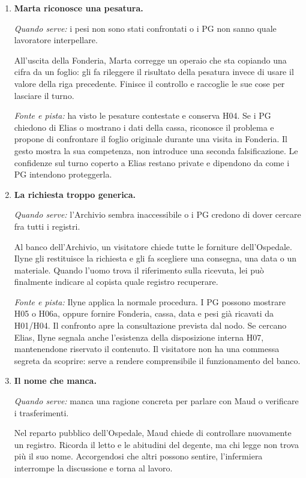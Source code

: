 \documentclass[11pt,a4paper]{article}
\begin{document}
\begin{enumerate}[leftmargin=*]
\item \textbf{Marta riconosce una pesatura.}

\textit{Quando serve:} i pesi non sono stati confrontati o i PG non sanno quale lavoratore interpellare.

All'uscita della Fonderia, Marta corregge un operaio che sta copiando una cifra da un foglio: gli fa rileggere il risultato della pesatura invece di usare il valore della riga precedente. Finisce il controllo e raccoglie le sue cose per lasciare il turno.

\textit{Fonte e pista:} ha visto le pesature contestate e conserva H04. Se i PG chiedono di Elias o mostrano i dati della cassa, riconosce il problema e propone di confrontare il foglio originale durante una visita in Fonderia. Il gesto mostra la sua competenza, non introduce una seconda falsificazione. Le confidenze sul turno coperto a Elias restano private e dipendono da come i PG intendono proteggerla.

\item \textbf{La richiesta troppo generica.}

\textit{Quando serve:} l'Archivio sembra inaccessibile o i PG credono di dover cercare fra tutti i registri.

Al banco dell'Archivio, un visitatore chiede tutte le forniture dell'Ospedale. Ilyne gli restituisce la richiesta e gli fa scegliere una consegna, una data o un materiale. Quando l'uomo trova il riferimento sulla ricevuta, lei può finalmente indicare al copista quale registro recuperare.

\textit{Fonte e pista:} Ilyne applica la normale procedura. I PG possono mostrare H05 o H06a, oppure fornire Fonderia, cassa, data e pesi già ricavati da H01/H04. Il confronto apre la consultazione prevista dal nodo. Se cercano Elias, Ilyne segnala anche l'esistenza della disposizione interna H07, mantenendone riservato il contenuto. Il visitatore non ha una commessa segreta da scoprire: serve a rendere comprensibile il funzionamento del banco.

\item \textbf{Il nome che manca.}

\textit{Quando serve:} manca una ragione concreta per parlare con Maud o verificare i trasferimenti.

Nel reparto pubblico dell'Ospedale, Maud chiede di controllare nuovamente un registro. Ricorda il letto e le abitudini del degente, ma chi legge non trova più il suo nome. Accorgendosi che altri possono sentire, l'infermiera interrompe la discussione e torna al lavoro.


\end{enumerate}
\end{document}
